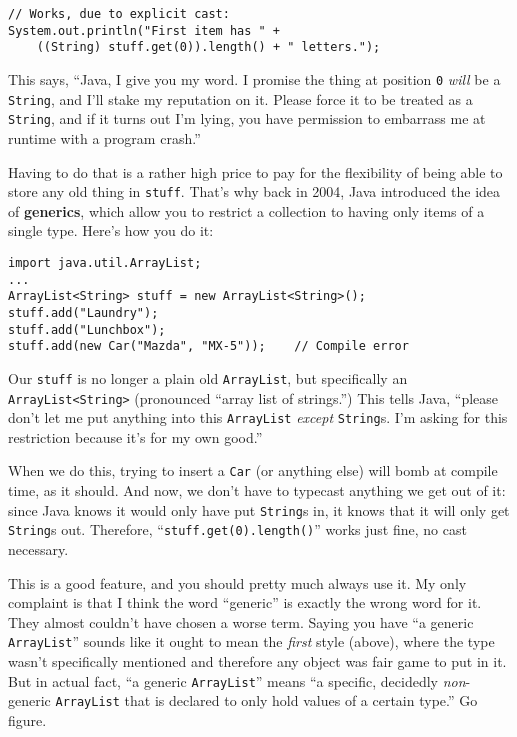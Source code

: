 \begin{Verbatim}[fontsize=\small,samepage=true]
// Works, due to explicit cast:
System.out.println("First item has " +
    ((String) stuff.get(0)).length() + " letters.");
\end{Verbatim}

This says, ``Java, I give you my word. I promise the thing at position
\texttt{0} \textit{will} be a \texttt{String}, and I'll stake my reputation on
it. Please force it to be treated as a \texttt{String}, and if it turns out
I'm lying, you have permission to embarrass me at runtime with a program
crash.''

Having to do that is a rather high price to pay for the flexibility of being
able to store any old thing in \texttt{stuff}. That's why back in 2004, Java
introduced the idea of \textbf{generics}, which allow you to restrict a
collection to having only items of a single type. Here's how you do it:

\begin{Verbatim}[fontsize=\small,samepage=true]
import java.util.ArrayList;
...
ArrayList<String> stuff = new ArrayList<String>();
stuff.add("Laundry");
stuff.add("Lunchbox");
stuff.add(new Car("Mazda", "MX-5"));    // Compile error
\end{Verbatim}

Our \texttt{stuff} is no longer a plain old \texttt{ArrayList}, but
specifically an \texttt{ArrayList<String>} (pronounced ``array list of
strings.'') This tells Java, ``please don't let me put anything into this
\texttt{ArrayList} \textit{except} \texttt{String}s. I'm asking for this
restriction because it's for my own good.''

When we do this, trying to insert a \texttt{Car} (or anything else) will bomb
at compile time, as it should. And now, we don't have to typecast anything we
get out of it: since Java knows it would only have put \texttt{String}s in, it
knows that it will only get \texttt{String}s out. Therefore,
``\texttt{stuff.get(0).length()}'' works just fine, no cast necessary.

This is a good feature, and you should pretty much always use it. My only
complaint is that I think the word ``generic'' is exactly the wrong word for
it. They almost couldn't have chosen a worse term. Saying you have ``a generic
\texttt{ArrayList}'' sounds like it ought to mean the \textit{first} style
(above), where the type wasn't specifically mentioned and therefore any object
was fair game to put in it. But in actual fact, ``a generic
\texttt{ArrayList}'' means ``a specific, decidedly \textit{non}-generic
\texttt{ArrayList} that is declared to only hold values of a certain type.''
Go figure.

